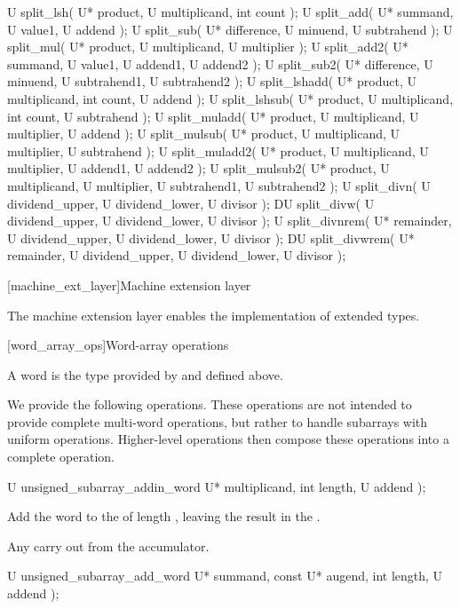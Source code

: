 \begin{addedblock}
\begin{itemdecl}
U split_lsh( U* product, U multiplicand, int count );
U split_add( U* summand, U value1, U addend );
U split_sub( U* difference, U minuend, U subtrahend );
U split_mul( U* product, U multiplicand, U multiplier );
U split_add2( U* summand, U value1, U addend1, U addend2 );
U split_sub2( U* difference, U minuend, U subtrahend1, U subtrahend2 );
U split_lshadd( U* product, U multiplicand, int count, U addend );
U split_lshsub( U* product, U multiplicand, int count, U subtrahend );
U split_muladd( U* product, U multiplicand, U multiplier, U addend );
U split_mulsub( U* product, U multiplicand, U multiplier, U subtrahend );
U split_muladd2( U* product, U multiplicand, U multiplier, U addend1, U addend2 );
U split_mulsub2( U* product, U multiplicand, U multiplier, U subtrahend1, U subtrahend2 );
U split_divn( U dividend_upper, U dividend_lower, U divisor );
DU split_divw( U dividend_upper, U dividend_lower, U divisor );
U split_divnrem( U* remainder, U dividend_upper, U dividend_lower, U divisor );
DU split_divwrem( U* remainder, U dividend_upper, U dividend_lower, U divisor );		
\end{itemdecl}

[machine_ext_layer]{Machine extension layer}

The machine extension layer enables the implementation of extended types.

[word_array_ops]{Word-array operations}

A word is the type provided by  and defined above.

We provide the following operations. These operations are not intended to provide complete multi-word operations, but rather to handle subarrays with uniform operations. Higher-level operations then compose these operations into a complete operation.

\begin{itemdecl}
U unsigned_subarray_addin_word U* multiplicand, int length, U addend );		
\end{itemdecl}

\begin{itemdescr}
\effects Add the word  to the  of length , leaving the result in the .

\returns Any carry out from the accumulator.    	
\end{itemdescr}

\begin{itemdecl}
U unsigned_subarray_add_word U* summand, const U* augend, int length, U addend );    
\end{itemdecl}


\end{addedblock}
